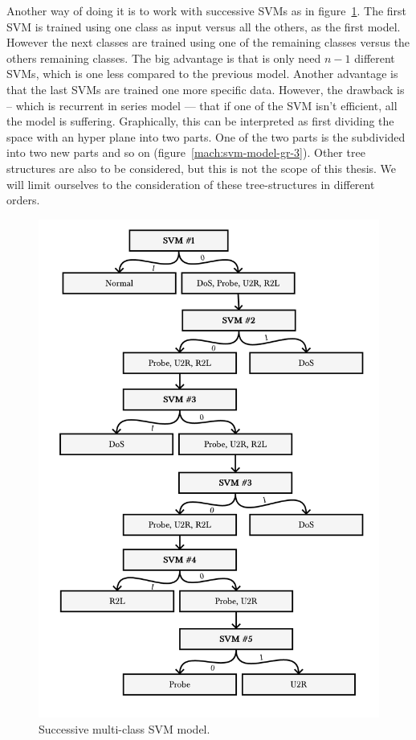 Another way of doing it is to work with successive SVMs as in figure~\ref{mach:svm-model-2}. The first SVM is trained using one class as input versus all the others, as the first model. However the next classes are trained using one of the remaining classes versus the others remaining classes. The big advantage is that is only need $n-1$ different SVMs, which is one less compared to the previous model. Another advantage is that the last SVMs are trained one more specific data. However, the drawback is -- which is recurrent in series model --- that if one of the SVM isn't efficient, all the model is suffering. Graphically, this can be interpreted as first dividing the space with an hyper plane into two parts. One of the two parts is the subdivided into two new parts and so on (figure~\ref{mach:svm-model-gr-3}). Other tree structures are also to be considered, but this is not the scope of this thesis. We will limit ourselves to the consideration of these tree-structures in different orders. 


\begin{figure}[ht!]
    \centering
    \includegraphics[width=.75\textwidth]{parts/chap-2/img-2/model-svm-2.png}
    \caption{Successive multi-class SVM model.} 
    \label{mach:svm-model-2}
\end{figure}


